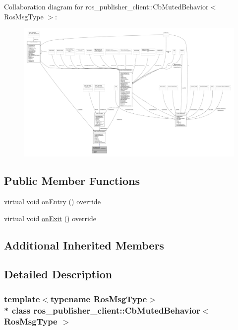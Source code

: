 Collaboration diagram for ros\+\_\+publisher\+\_\+client\+:\+:Cb\+Muted\+Behavior$<$ Ros\+Msg\+Type $>$\+:\nopagebreak
\begin{figure}[H]
\begin{center}
\leavevmode
\includegraphics[width=350pt]{classros__publisher__client_1_1CbMutedBehavior__coll__graph}
\end{center}
\end{figure}
\subsection*{Public Member Functions}
\begin{DoxyCompactItemize}
\item 
virtual void \hyperlink{classros__publisher__client_1_1CbMutedBehavior_a080b2db7ff4aa25463423e4b0a8ee572}{on\+Entry} () override
\item 
virtual void \hyperlink{classros__publisher__client_1_1CbMutedBehavior_aad2c833afdc6f5d81f3ddce3c0f767e3}{on\+Exit} () override
\end{DoxyCompactItemize}
\subsection*{Additional Inherited Members}


\subsection{Detailed Description}
\subsubsection*{template$<$typename Ros\+Msg\+Type$>$\\*
class ros\+\_\+publisher\+\_\+client\+::\+Cb\+Muted\+Behavior$<$ Ros\+Msg\+Type $>$}



